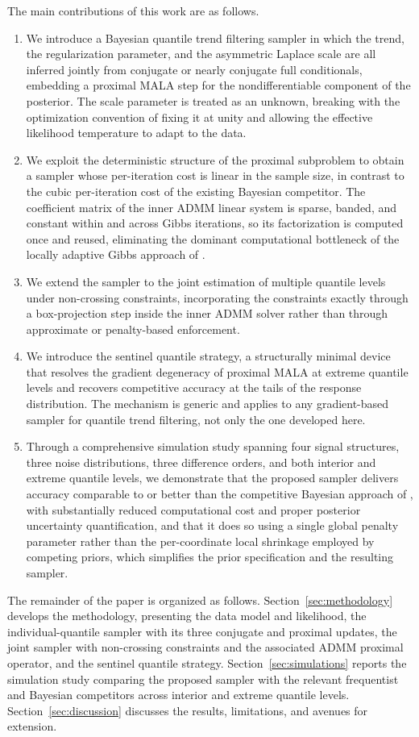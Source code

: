 The main contributions of this work are as follows.
\begin{enumerate}
    \item We introduce a Bayesian quantile trend filtering sampler in which the trend, the regularization parameter, and the asymmetric Laplace scale are all inferred jointly from conjugate or nearly conjugate full conditionals, embedding a proximal MALA step for the nondifferentiable component of the posterior. The scale parameter is treated as an unknown, breaking with the optimization convention of fixing it at unity and allowing the effective likelihood temperature to adapt to the data.
    \item We exploit the deterministic structure of the proximal subproblem to obtain a sampler whose per-iteration cost is linear in the sample size, in contrast to the cubic per-iteration cost of the existing Bayesian competitor. The coefficient matrix of the inner ADMM linear system is sparse, banded, and constant within and across Gibbs iterations, so its factorization is computed once and reused, eliminating the dominant computational bottleneck of the locally adaptive Gibbs approach of \citet{onizuka2024fast}.
    \item We extend the sampler to the joint estimation of multiple quantile levels under non-crossing constraints, incorporating the constraints exactly through a box-projection step inside the inner ADMM solver rather than through approximate or penalty-based enforcement.
    \item We introduce the sentinel quantile strategy, a structurally minimal device that resolves the gradient degeneracy of proximal MALA at extreme quantile levels and recovers competitive accuracy at the tails of the response distribution. The mechanism is generic and applies to any gradient-based sampler for quantile trend filtering, not only the one developed here.
    \item Through a comprehensive simulation study spanning four signal structures, three noise distributions, three difference orders, and both interior and extreme quantile levels, we demonstrate that the proposed sampler delivers accuracy comparable to or better than the competitive Bayesian approach of \citet{onizuka2024fast}, with substantially reduced computational cost and proper posterior uncertainty quantification, and that it does so using a single global penalty parameter rather than the per-coordinate local shrinkage employed by competing priors, which simplifies the prior specification and the resulting sampler.
\end{enumerate}

The remainder of the paper is organized as follows. Section~\ref{sec:methodology} develops the methodology, presenting the data model and likelihood, the individual-quantile sampler with its three conjugate and proximal updates, the joint sampler with non-crossing constraints and the associated ADMM proximal operator, and the sentinel quantile strategy. Section~\ref{sec:simulations} reports the simulation study comparing the proposed sampler with the relevant frequentist and Bayesian competitors across interior and extreme quantile levels. Section~\ref{sec:discussion} discusses the results, limitations, and avenues for extension.